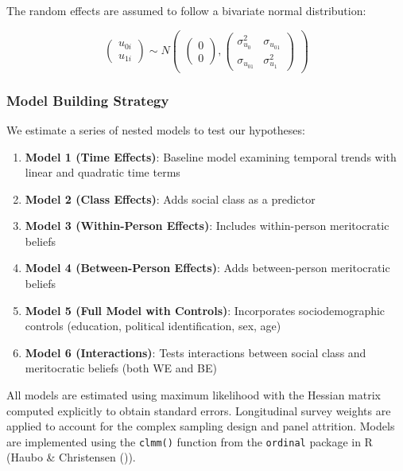\documentclass[
  12pt,
]{article}
\providecommand{\tightlist}{%
  \setlength{\itemsep}{0pt}\setlength{\parskip}{0pt}}
\begin{document}
The random effects are assumed to follow a bivariate normal
distribution:

\[
\begin{pmatrix} u_{0i} \\ u_{1i} \end{pmatrix} \sim N \begin{pmatrix} \begin{pmatrix} 0 \\ 0 \end{pmatrix}, \begin{pmatrix} \sigma^2_{u_0} & \sigma_{u_{01}} \\ \sigma_{u_{01}} & \sigma^2_{u_1} \end{pmatrix} \end{pmatrix}
\]

\subsubsection{Model Building Strategy}\label{model-building-strategy}

We estimate a series of nested models to test our hypotheses:

\begin{enumerate}
\def\labelenumi{\arabic{enumi}.}
\tightlist
\item
  \textbf{Model 1 (Time Effects)}: Baseline model examining temporal
  trends with linear and quadratic time terms
\item
  \textbf{Model 2 (Class Effects)}: Adds social class as a predictor
\item
  \textbf{Model 3 (Within-Person Effects)}: Includes within-person
  meritocratic beliefs
\item
  \textbf{Model 4 (Between-Person Effects)}: Adds between-person
  meritocratic beliefs
\item
  \textbf{Model 5 (Full Model with Controls)}: Incorporates
  sociodemographic controls (education, political identification, sex,
  age)
\item
  \textbf{Model 6 (Interactions)}: Tests interactions between social
  class and meritocratic beliefs (both WE and BE)
\end{enumerate}

All models are estimated using maximum likelihood with the Hessian
matrix computed explicitly to obtain standard errors. Longitudinal
survey weights are applied to account for the complex sampling design
and panel attrition. Models are implemented using the \texttt{clmm()}
function from the \texttt{ordinal} package in R (Haubo \& Christensen
()).
\end{document}
